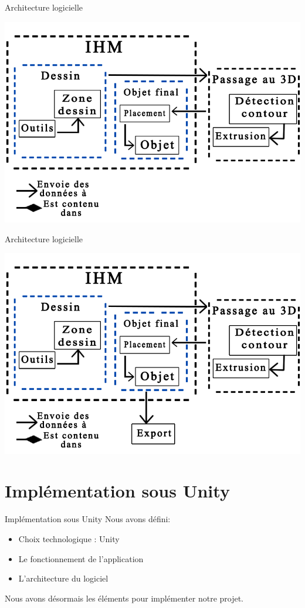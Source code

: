 \documentclass[a4paper,10pt]{beamer}
\begin{document}
	\begin{frame}{Architecture logicielle} %
		\centerline{\includegraphics[scale=0.3]{images/archilogi/archi4.png}}
	\end{frame}
	\begin{frame}{Architecture logicielle} %
		\centerline{\includegraphics[scale=0.3]{images/archilogi/archi5.png}}
	\end{frame}	
			
	\section{Implémentation sous Unity}
			\begin{frame}{Implémentation sous Unity}
				Nous avons défini:
					\begin{itemize}
						\item Choix technologique : Unity
						\item Le fonctionnement de l'application
						\item L'architecture du logiciel
					\end{itemize}
					
				Nous avons désormais les éléments pour implémenter notre projet.
			\end{frame}
		
\end{document}
